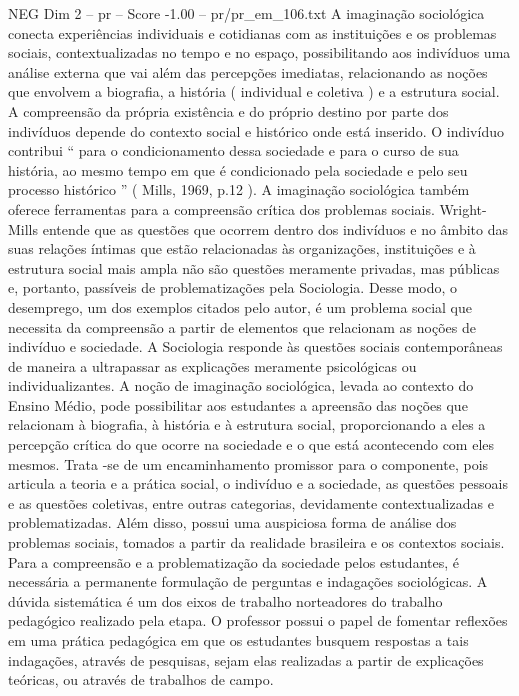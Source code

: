 \begin{textsample}{NEG Dim 2 – pr – Score -1.00 – pr/pr\_em\_106.txt}
A imaginação sociológica conecta experiências individuais e cotidianas com as instituições e os problemas sociais, contextualizadas no tempo e no espaço, possibilitando aos indivíduos uma análise externa que vai além das percepções imediatas, relacionando as noções que envolvem a biografia, a história ( individual e coletiva ) e a estrutura social.
A compreensão da própria existência e do próprio destino por parte dos indivíduos depende do contexto social e histórico onde está inserido.
O indivíduo contribui “ para o condicionamento dessa sociedade e para o curso de sua história, ao mesmo tempo em que é condicionado pela sociedade e pelo seu processo histórico ” ( Mills, 1969, p.12 ).
A imaginação sociológica também oferece ferramentas para a compreensão crítica dos problemas sociais.
Wright-Mills entende que as questões que ocorrem dentro dos indivíduos e no âmbito das suas relações íntimas que estão relacionadas às organizações, instituições e à estrutura social mais ampla não são questões meramente privadas, mas públicas e, portanto, passíveis de problematizações pela Sociologia.
Desse modo, o desemprego, um dos exemplos citados pelo autor, é um problema social que necessita da compreensão a partir de elementos que relacionam as noções de indivíduo e sociedade.
A Sociologia responde às questões sociais contemporâneas de maneira a ultrapassar as explicações meramente psicológicas ou individualizantes.
A noção de imaginação sociológica, levada ao contexto do Ensino Médio, pode possibilitar aos estudantes a apreensão das noções que relacionam à biografia, à história e à estrutura social, proporcionando a eles a percepção crítica do que ocorre na sociedade e o que está acontecendo com eles mesmos.
Trata -se de um encaminhamento promissor para o componente, pois articula a teoria e a prática social, o indivíduo e a sociedade, as questões pessoais e as questões coletivas, entre outras categorias, devidamente contextualizadas e problematizadas.
Além disso, possui uma auspiciosa forma de análise dos problemas sociais, tomados a partir da realidade brasileira e os contextos sociais.
Para a compreensão e a problematização da sociedade pelos estudantes, é necessária a permanente formulação de perguntas e indagações sociológicas.
A dúvida sistemática é um dos eixos de trabalho norteadores do trabalho pedagógico realizado pela etapa.
O professor possui o papel de fomentar reflexões em uma prática pedagógica em que os estudantes busquem respostas a tais indagações, através de pesquisas, sejam elas realizadas a partir de explicações teóricas, ou através de trabalhos de campo.

\end{textsample}
